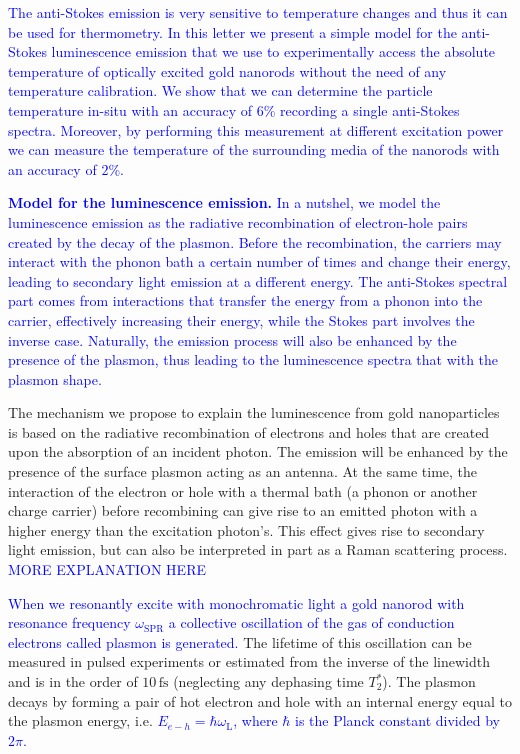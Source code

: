 \documentclass[journal=nalefd,manuscript=letter]{achemso}
\newcommand{\HI}[1]{\textcolor{blue}{#1}} %
\newcommand{\fs}{\ensuremath{\,\textrm{fs}}}
\begin{document}
\HI{The anti-Stokes emission is very sensitive to temperature changes and thus 
it can be used for thermometry\cite{xie2016thermometry}. In this letter we present 
a simple model for the anti-Stokes luminescence emission that we use to experimentally 
access the absolute temperature of optically excited gold nanorods without the need of 
any temperature calibration. We show that we can determine the particle temperature 
in-situ with an accuracy of $6$\% recording a single anti-Stokes spectra. 
Moreover, by performing this measurement at different excitation power 
we can measure the temperature of the surrounding media 
of the nanorods with an accuracy of $2$\%.}

\HI{\textbf{Model for the luminescence emission.} 
In a nutshel, we model the luminescence emission as the radiative recombination of
electron-hole pairs created by the decay of the plasmon. Before the recombination,
the carriers may interact with the phonon bath a certain number of times and
change their energy, leading to secondary light emission at a different energy. 
The anti-Stokes spectral part comes from interactions that transfer the energy 
from a phonon into the carrier, effectively increasing their energy, while the Stokes
part involves the inverse case. Naturally, the emission process will also 
be enhanced by the presence of the plasmon, thus leading to the luminescence spectra
that with the plasmon shape.}


The mechanism we propose to explain the luminescence from gold nanoparticles is
based on the radiative recombination of electrons and holes that are created
upon the absorption of an incident photon\cite{Dulkeith2004,Mooradian1969}. The
emission will be enhanced by the presence of the surface plasmon acting as an
antenna\cite{Mohamed2000}. At the same time, the interaction
of the electron or hole with a thermal bath (a phonon or another charge carrier) before
recombining can give rise to an emitted photon with a higher energy than the
excitation photon's\cite{Hodak2000,Giri2015,Arbouet2003a}.
This effect gives rise to secondary light emission, but can also be interpreted in part as a Raman scattering
process.\cite{Huang2014} \HI{MORE EXPLANATION HERE}

\HI{When we resonantly excite with monochromatic light a gold nanorod with 
resonance frequency  $\omega_\textrm{SPR}$ a collective oscillation of the gas of conduction
electrons called plasmon is generated.} The lifetime of this oscillation can be measured in
pulsed experiments or estimated from the inverse of the linewidth and is in the
order of $10\fs$\cite{Sonnichsen2002} (neglecting any dephasing time $T_2^*$).
The plasmon decays by forming a pair of hot electron and hole with an internal energy equal to the plasmon
energy\cite{Sundararaman2014,Brongersma2015,AlejandroManjavacasJunG.LiuVikramKulkarni2014}, i.e. \HI{
$E_{e-h}=\hbar \omega_\textrm{L}$, where $\hbar$ is the Planck constant divided by $2\pi$.}
\end{document}
